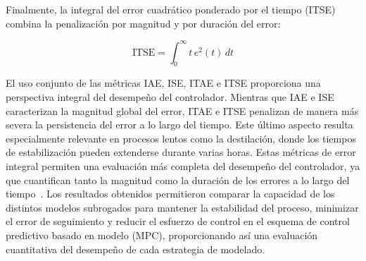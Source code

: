 Finalmente, la integral del error cuadrático ponderado por el tiempo (ITSE) combina la
penalización por magnitud y por duración del error:

\begin{equation}
    \mathrm{ITSE} = \int_0^{\infty} t\, e^2(t)\, dt
    \label{eq:ITSE}
\end{equation}

El uso conjunto de las métricas IAE, ISE, ITAE e ITSE proporciona una perspectiva integral del desempeño del controlador. Mientras que IAE e ISE caracterizan la magnitud global del error, ITAE e ITSE penalizan de manera más severa la persistencia del error a lo largo del tiempo. Este último aspecto resulta especialmente relevante en procesos lentos como la destilación, donde los tiempos de estabilización pueden extenderse durante varias horas. Estas métricas de error integral permiten una evaluación más completa del desempeño del controlador, ya que cuantifican tanto la magnitud como la duración de los errores a lo largo del tiempo~\cite{ref25}. Los resultados obtenidos permitieron comparar la capacidad de los distintos modelos subrogados para mantener la estabilidad del proceso, minimizar el error de seguimiento y reducir el esfuerzo de control en el esquema de control predictivo basado en modelo (MPC), proporcionando así una evaluación cuantitativa del desempeño de cada estrategia de modelado.